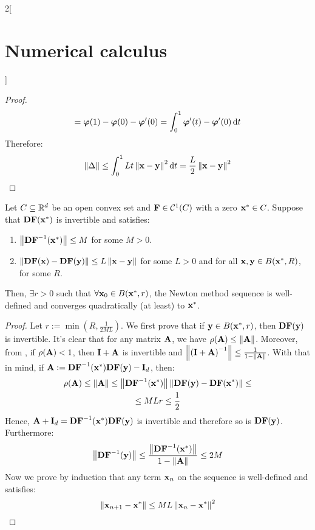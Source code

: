 \documentclass[../../../main_math.tex]{subfiles}
\begin{document}
\begin{multicols}{2}[\section{Numerical calculus}]
\begin{proof}
\begin{multline*}
      =\vf\varphi(1)-\vf\varphi(0)-\vf\varphi'(0)=\int_0^1\vf\varphi'(t)-\vf\varphi'(0)\dd{t}
    \end{multline*}
    Therefore:
    $$\norm{\Delta}\leq \int_0^1Lt \norm{\vf{x}-\vf{y}}^2\dd{t}=\frac{L}{2}\norm{\vf{x}-\vf{y}}^2
    $$
  \end{proof}
  \begin{theorem}
    Let $C\subseteq \RR^d$ be an open convex set and $\vf{F}\in\mathcal{C}^1(C)$ with a zero $\vf{x}^*\in C$. Suppose that $\vf{DF}(\vf{x}^*)$ is invertible and satisfies:
    \begin{enumerate}
      \item $\norm{{\vf{DF}}^{-1}(\vf{x}^*)}\leq M$ for some $M>0$.
      \item $\norm{\vf{DF}(\vf{x}) - \vf{DF}(\vf{y})}\leq L\norm{\vf{x}-\vf{y}}$ for some $L>0$ and for all $\vf{x},\vf{y}\in B(\vf{x}^*,R)$, for some $R$.
    \end{enumerate}
    Then, $\exists r>0$ such that $\forall \vf{x}_0\in B(\vf{x}^*,r)$, the Newton method sequence is well-defined and converges quadratically (at least) to $\vf{x}^*$.
  \end{theorem}
  \begin{proof}
    Let $r:=\min\left(R,\frac{1}{2ML}\right)$. We first prove that if $\vf{y}\in B(\vf{x}^*,r)$, then $\vf{DF}(\vf{y})$ is invertible. It's clear that for any matrix $\vf{A}$, we have $\rho(\vf{A})\leq\norm{\vf{A}}$. Moreover, from , if $\rho(\vf{A})<1$, then $\vf{I}+\vf{A}$ is invertible and $\norm{{(\vf{I}+\vf{A})}^{-1}}\leq\frac{1}{1-\norm{\vf{A}}}$. With that in mind, if $\vf{A}:={\vf{DF}}^{-1}(\vf{x}^*)\vf{DF}(\vf{y}) -\vf{I}_d$, then:
    \begin{multline*}
      \rho(\vf{A})\leq\norm{\vf{A}}\leq\norm{{\vf{DF}}^{-1}(\vf{x}^*)}\norm{\vf{DF}(\vf{y})-\vf{DF}(\vf{x}^*)}\leq \\
      \leq MLr\leq\frac{1}{2}
    \end{multline*}
    Hence, $\vf{A}+\vf{I}_d={\vf{DF}}^{-1}(\vf{x}^*)\vf{DF}(\vf{y})$ is invertible and therefore so is $\vf{DF}(\vf{y})$. Furthermore:
    \begin{equation}\label{NC:insideNew}
      \norm{{\vf{DF}}^{-1}(\vf{y})} \leq \frac{\norm{{\vf{DF}}^{-1}(\vf{x}^*)}}{1 - \norm{\vf{A}}}\leq  2M
    \end{equation}
    Now we prove by induction that any term $\vf{x}_n$ on the sequence is well-defined and satisfies:
    $$
      \norm{\vf{x}_{n+1}-\vf{x}^*}\leq ML\norm{\vf{x}_n-\vf{x}^*}^2
    $$

\end{proof}
\end{multicols}
\end{document}
